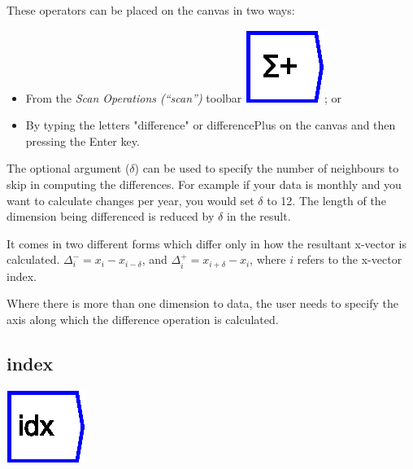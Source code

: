 These operators can be placed on the canvas in two ways:
\begin{itemize}
\item From the \emph{Scan Operations (``scan'')} toolbar \includegraphics{images/runningSum};
or 
\item By typing the letters "difference" or \textquotedbl differencePlus\textquotedbl{}
on the canvas and then pressing the Enter key.
\end{itemize}
The optional argument ($\delta$) can be used to specify the number
of neighbours to skip in computing the differences. For example if
your data is monthly and you want to calculate changes per year, you
would set $\delta$ to 12. The length of the dimension being differenced
is reduced by $\delta$ in the result.

It comes in two different forms which differ only in how the resultant
x-vector is calculated. $\Delta_{i}^{-}=x_{i}-x_{i-\delta}$, and
$\Delta_{i}^{+}=x_{i+\delta}-x_{i}$, where $i$ refers to the x-vector
index.

Where there is more than one dimension to data, the user needs to
specify the axis along which the difference operation is calculated.

\subsection{index}

\label{Operation:index}

\includegraphics{images/index}

